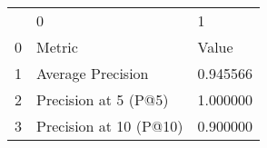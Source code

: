 \begin{tabular}{lll}
 & 0 & 1 \\
0 & Metric & Value \\
1 & Average Precision & 0.945566 \\
2 & Precision at 5 (P@5) & 1.000000 \\
3 & Precision at 10 (P@10) & 0.900000 \\
\end{tabular}
